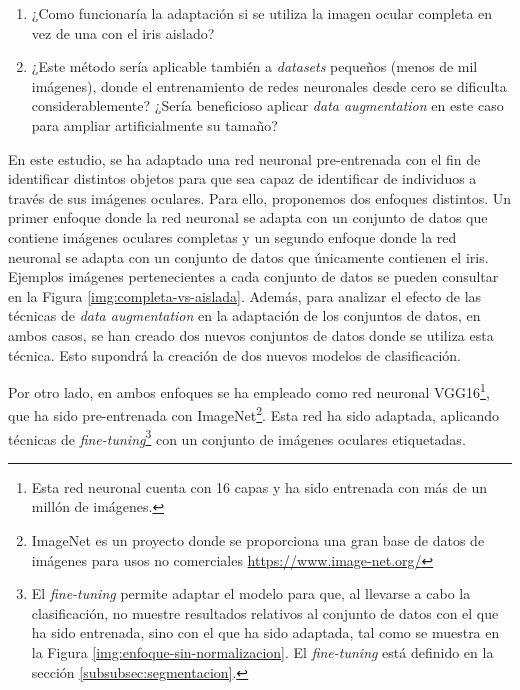 \begin{enumerate}
    \item ¿Como funcionaría la adaptación si se utiliza la imagen ocular completa en vez de una con el iris aislado?
    \item ¿Este método sería aplicable también a \textit{datasets} pequeños (menos de mil imágenes), donde el entrenamiento de redes neuronales desde cero se dificulta considerablemente? ¿Sería beneficioso aplicar \textit{data augmentation} en este caso para ampliar artificialmente su tamaño?
\end{enumerate}


En este estudio, se ha adaptado una red neuronal pre-entrenada con el fin de identificar distintos objetos para que sea capaz de identificar de individuos a través de sus imágenes oculares. Para ello, proponemos dos enfoques distintos. Un primer enfoque donde la red neuronal se adapta con un conjunto de datos que contiene imágenes oculares completas y un segundo enfoque donde la red neuronal se adapta con un conjunto de datos que únicamente contienen el iris. Ejemplos imágenes pertenecientes a cada conjunto de datos se pueden consultar en la Figura \ref{img:completa-vs-aislada}.   
Además, para analizar el efecto de las técnicas de \textit{data augmentation} en la adaptación de los conjuntos de datos, en ambos casos, se han creado dos nuevos conjuntos de datos donde se utiliza esta técnica. Esto supondrá la creación de dos nuevos modelos de clasificación.



Por otro lado, en ambos enfoques se ha empleado como red neuronal VGG16\footnote{Esta red neuronal cuenta con 16 capas y ha sido entrenada con más de un millón de imágenes.}, que ha sido pre-entrenada con ImageNet\footnote{ImageNet es un proyecto donde se proporciona 
una gran base de datos de imágenes para usos no comerciales \url{https://www.image-net.org/}}. Esta red ha sido adaptada, aplicando técnicas de \textit{fine-tuning}\footnote{El \textit{fine-tuning} 
permite adaptar el modelo para que, al llevarse a cabo la clasificación, no muestre resultados relativos al conjunto de datos con el que ha sido entrenada, sino con el que ha sido adaptada, tal como se muestra en la Figura \ref{img:enfoque-sin-normalizacion}. El \textit{fine-tuning} está definido en la sección \ref{subsubsec:segmentacion}.}
 con un conjunto de imágenes oculares etiquetadas.

